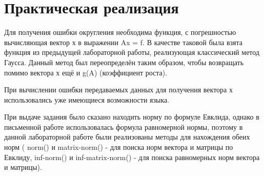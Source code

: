 \documentclass[a4paper, 14pt]{extarticle}
\begin{document}
\pagebreak
\section{Практическая реализация}
\par
Для получения ошибки округления необходима функция, с погрешностью вычисляющая вектор х в выражении Ax = f. В качестве таковой была взята функция из предыдущей лабораторной работы, реализующая классический метод Гаусса. Данный метод был переопределён таким образом, чтобы возвращать помимо вектора х ещё и g(A) (коэффициент роста).
\par
При вычислении ошибки передаваемых данных для получения вектора х использовались уже имеющиеся возможности языка. 
\par
При выдаче задания было сказано находить норму по формуле Евклида, однако в письменной работе использовалась формула равномерной нормы, поэтому в данной лабораторной работе были реализованы методы для нахождения обеих норм ( norm() и matrix-norm() - для поиска норм вектора и матрицы по Евклиду, inf-norm() и inf-matrix-norm() - для поиска равномерных норм вектора и матрицы).
\par
\end{document}
